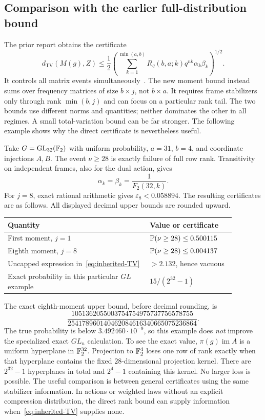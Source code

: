 \subsection{Comparison with the earlier full-distribution bound}

The prior report obtains the certificate
\begin{equation}
 d_{\mathrm{TV}}(M(g),Z)
 \le\frac12\left(
   \sum_{k=1}^{\min(a,b)}R_q(b,a;k)q^{nk}\alpha_k\beta_k
       \right)^{1/2}.
 \label{eq:inherited-TV}
\end{equation}
It controls all matrix events simultaneously~\cite{priorSymplectic}.
The new moment bound instead sums over frequency matrices of size
$b\times j$, not $b\times a$. It requires frame stabilizers only through
rank $\min(b,j)$ and can focus on a particular rank tail. The two bounds
use different norms and quantities; neither dominates the other in all
regimes. A small total-variation bound can be far stronger. The following
example shows why the direct certificate is nevertheless useful.

Take $G=\operatorname{GL}_{32}(\mathbb F_2)$ with uniform probability, $a=31$,
$b=4$, and coordinate injections $A,B$. The event
$\nu\ge28$ is exactly failure of full row rank. Transitivity on independent
frames, also for the dual action, gives
\[
 \alpha_k=\beta_k=\frac{1}{F_2(32,k)}.
\]
For $j=8$, exact rational arithmetic gives
$\varepsilon_8<0.058894$. The resulting certificates are as follows.
All displayed decimal upper bounds are rounded upward.

\begin{center}
\begin{tabular}{p{0.55\linewidth}p{0.33\linewidth}}
\hline
Quantity & Value or certificate\\
\hline
First moment, $j=1$ & $\mathbb P(\nu\ge28)\le0.500115$\\
Eighth moment, $j=8$ & $\mathbb P(\nu\ge28)\le0.004137$\\
Uncapped expression in~\eqref{eq:inherited-TV}
 & $>2.132$, hence vacuous\\
Exact probability in this particular $GL$ example
 & $15/(2^{32}-1)$\\
\hline
\end{tabular}
\end{center}

The exact eighth-moment upper bound, before decimal rounding, is
\[
 \frac{1051362055003754754975737756578755}
      {254178960140462084616340665075236864}.
\]
The true probability is below $3.492460\cdot10^{-9}$, so this example
does \emph{not} improve the specialized exact $GL_n$ calculation.
To see the exact value, $\pi(g)\operatorname{im}A$ is a uniform hyperplane
in $\mathbb F_2^{32}$. Projection to $\mathbb F_2^4$ loses one row of rank exactly when
that hyperplane contains the fixed $28$-dimensional projection kernel.
There are $2^{32}-1$ hyperplanes in total and $2^4-1$ containing this kernel.
No larger loss is possible. The useful comparison is between general
certificates using the same stabilizer information. In actions or weighted
laws without an explicit compression distribution, the direct rank bound
can supply information when~\eqref{eq:inherited-TV} supplies none.

